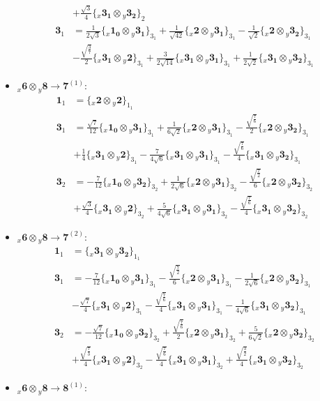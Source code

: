 \documentclass[english]{article}
\newcommand{\rep}[1]{\mathbf{#1}}
\newcommand{\repx}[2]{{}_{#2}\mathbf{#1}}
\newcommand{\subcg}[3]{\big\{ \repx{#1}{x}\otimes\repx{#2}{y}\big\}^{}_{#3}}
\begin{document}
\begin{itemize}
\begin{align*}
 & +\frac{\sqrt{3}}{4}\subcg{3_{1}}{3_{2}}{2}
\\
\rep{3}_{1} & = \frac{1}{2 \sqrt{3}}\subcg{1_{0}}{3_{1}}{3_{1}}+\frac{1}{\sqrt{42}}\subcg{2}{3_{1}}{3_{1}}-\frac{1}{\sqrt{2}}\subcg{2}{3_{2}}{3_{1}} \\ 
 & -\frac{\sqrt{\frac{3}{7}}}{2}\subcg{3_{1}}{2}{3_{1}}+\frac{3}{2 \sqrt{14}}\subcg{3_{1}}{3_{1}}{3_{1}}+\frac{1}{2 \sqrt{2}}\subcg{3_{1}}{3_{2}}{3_{1}}
\end{align*}
\item $\repx{6}{x}\otimes\repx{8}{y}\to\rep{7}^{(1)}$:
\begin{align*}
\rep{1}_{1} & = \subcg{2}{2}{1_{1}}
\\
\rep{3}_{1} & = \frac{\sqrt{7}}{12}\subcg{1_{0}}{3_{1}}{3_{1}}+\frac{1}{6 \sqrt{2}}\subcg{2}{3_{1}}{3_{1}}-\frac{\sqrt{\frac{7}{6}}}{2}\subcg{2}{3_{2}}{3_{1}} \\ 
 & +\frac{1}{4}\subcg{3_{1}}{2}{3_{1}}-\frac{7}{4 \sqrt{6}}\subcg{3_{1}}{3_{1}}{3_{1}}-\frac{\sqrt{\frac{7}{6}}}{4}\subcg{3_{1}}{3_{2}}{3_{1}}
\\
\rep{3}_{2} & = -\frac{7}{12}\subcg{1_{0}}{3_{2}}{3_{2}}+\frac{1}{2 \sqrt{6}}\subcg{2}{3_{1}}{3_{2}}-\frac{\sqrt{\frac{7}{2}}}{6}\subcg{2}{3_{2}}{3_{2}} \\ 
 & +\frac{\sqrt{3}}{4}\subcg{3_{1}}{2}{3_{2}}+\frac{5}{4 \sqrt{6}}\subcg{3_{1}}{3_{1}}{3_{2}}-\frac{\sqrt{\frac{7}{6}}}{4}\subcg{3_{1}}{3_{2}}{3_{2}}
\end{align*}
\item $\repx{6}{x}\otimes\repx{8}{y}\to\rep{7}^{(2)}$:
\begin{align*}
\rep{1}_{1} & = \subcg{3_{1}}{3_{2}}{1_{1}}
\\
\rep{3}_{1} & = -\frac{7}{12}\subcg{1_{0}}{3_{1}}{3_{1}}-\frac{\sqrt{\frac{7}{2}}}{6}\subcg{2}{3_{1}}{3_{1}}-\frac{1}{2 \sqrt{6}}\subcg{2}{3_{2}}{3_{1}} \\ 
 & -\frac{\sqrt{7}}{4}\subcg{3_{1}}{2}{3_{1}}-\frac{\sqrt{\frac{7}{6}}}{4}\subcg{3_{1}}{3_{1}}{3_{1}}-\frac{1}{4 \sqrt{6}}\subcg{3_{1}}{3_{2}}{3_{1}}
\\
\rep{3}_{2} & = -\frac{\sqrt{7}}{12}\subcg{1_{0}}{3_{2}}{3_{2}}+\frac{\sqrt{\frac{7}{6}}}{2}\subcg{2}{3_{1}}{3_{2}}+\frac{5}{6 \sqrt{2}}\subcg{2}{3_{2}}{3_{2}} \\ 
 & +\frac{\sqrt{\frac{7}{3}}}{4}\subcg{3_{1}}{2}{3_{2}}-\frac{\sqrt{\frac{7}{6}}}{4}\subcg{3_{1}}{3_{1}}{3_{2}}+\frac{\sqrt{\frac{3}{2}}}{4}\subcg{3_{1}}{3_{2}}{3_{2}}
\end{align*}
\item $\repx{6}{x}\otimes\repx{8}{y}\to\rep{8}^{(1)}$:

\end{itemize}
\end{document}
